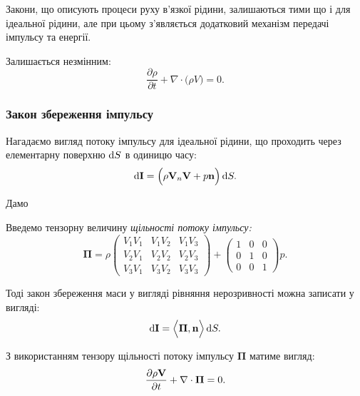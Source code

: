 Закони, що описують процеси руху в'язкої рідини, залишаються тими що і для ідеальної рідини, але при цьому з'являється додатковий механізм передачі імпульсу та енергії. \medskip

\begin{law}
	Залишається незмінним:
	\begin{equation}
		\frac{\partial \rho}{\partial t} + \nabla \cdot \Big(\rho V\Big) = 0.		
	\end{equation}
\end{law}

\subsubsection{Закон збереження імпульсу}

Нагадаємо вигляд потоку імпульсу для ідеальної рідини, що проходить через елементарну поверхню $\mathop{}\!\mathrm{d} S$ в одиницю часу:
\begin{equation}
	\mathop{}\!\mathrm{d} \textbf{I} = \Big(\rho \textbf{V}_n \textbf{V} + p \textbf{n}\Big) \mathop{}\!\mathrm{d} S.
\end{equation}

Дамо
\begin{definition}
	Введемо тензорну величину \it{щільності потоку імпульсу}:
	\begin{equation}
		\bm{\Pi} = \rho 
		\begin{pmatrix}
			V_1 V_1 & V_1 V_2 & V_1 V_3 \\
			V_2 V_1 & V_2 V_2 & V_2 V_3 \\
			V_3 V_1 & V_3 V_2 & V_3 V_3
		\end{pmatrix}
		+
		\begin{pmatrix}
			1 & 0 & 0 \\
			0 & 1 & 0 \\
			0 & 0 & 1
		\end{pmatrix}
		p.
	\end{equation}
\end{definition}

Тоді закон збереження маси у вигляді рівняння нерозривності можна записати у вигляді: 
\begin{equation}
	\mathop{}\!\mathrm{d} \textbf{I} = \Big\langle \bm{\Pi}, \textbf{n} \Big\rangle \mathop{}\!\mathrm{d} S.
\end{equation}

\begin{law}
	З використанням тензору щільності потоку імпульсу $\bm{\Pi}$ матиме вигляд:
	\begin{equation}
		\frac{\partial \rho \textbf{V}}{\partial t} + \nabla \cdot \bm{\Pi} = 0.
	\end{equation}
\end{law}

